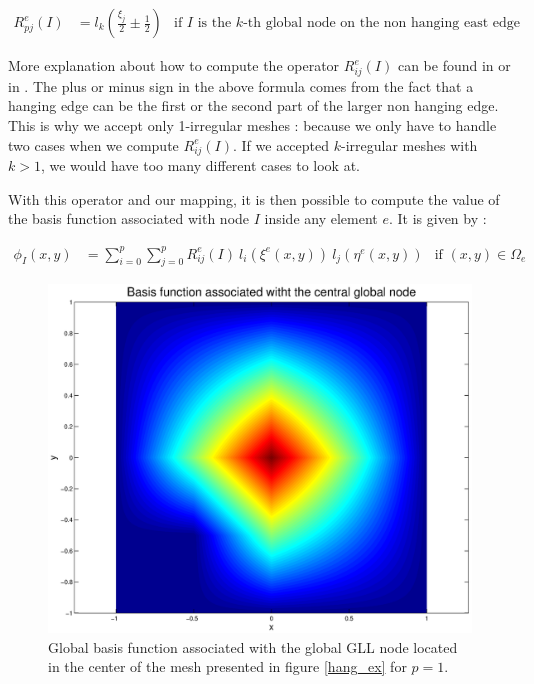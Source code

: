 \begin{align*}
R^e_{pj}(I) &= l_k \left(\frac{\xi_j}{2}\pm \frac{1}{2}\right) &\text{if $I$ is the $k$-th global node on the non hanging east edge}
\end{align*} 

More explanation about how to compute the operator $R^e_{ij}(I)$ can be found in \cite{hang_handle} or in \cite{hang_easy}. The plus or minus sign in the above formula comes from the fact that a hanging edge can be the first or the second part of the larger non hanging edge. This is why we accept only 1-irregular meshes : because we only have to handle two cases when we compute $R^e_{ij}(I)$. If we accepted $k$-irregular meshes with $k>1$, we would have too many different cases to look at. 

With this operator and our mapping, it is then possible to compute the value of the basis function associated with node $I$ inside any element $e$. It is given by : 

\begin{align}
\phi_I(x,y) &= \sum_{i=0}^p\sum_{j=0}^p R^e_{ij}(I) \: l_i(\xi^e(x,y))\: l_j(\eta^e(x,y)) &\text{if $(x,y) \in \Omega_e$}\label{eq:global_basis}
\end{align}

\begin{figure}
\centering
\includegraphics[scale=0.25]{Theory/global_basis_func.eps}
\caption{Global basis function associated with the global GLL node located in the center of the mesh presented in figure \ref{hang_ex} for $p=1$.}
\label{global_basis_func}
\end{figure}



